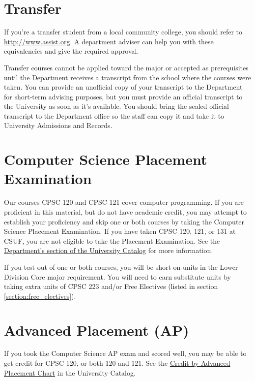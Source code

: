 \documentclass{book}
\newcommand{\campusname}{CSUF}
\begin{document}
\section{Transfer}

If you're a transfer student from a local community college, you should refer to \url{http://www.assist.org}. A department adviser can help you with these equivalencies and give the required approval.

Transfer courses cannot be applied toward the major or accepted as prerequisites until the Department receives a transcript from the school where the courses were taken. You can provide an unofficial copy of your transcript to the Department for short-term advising purposes, but you must provide an official transcript to the University as soon as it’s available. You should bring the sealed official transcript to the Department office so the staff can copy it and take it to University Admissions and Records.

\section{Computer Science Placement Examination}
\label{section:placement}
Our courses CPSC 120 and CPSC 121 cover computer programming. If you are proficient in this material, but do not have academic credit, you may attempt to establish your proficiency and skip one or both courses by taking the Computer Science Placement Examination. If you have taken CPSC 120, 121, or 131 at \campusname, you are not eligible to take the Placement Examination. See the \href{http://catalog.fullerton.edu/preview_program.php?catoid=2&poid=537&returnto=137}{Department's section of the University Catalog} for more information.

If you test out of one or both courses, you will be short on units in the Lower Division Core major requirement. You will need to earn substitute units by taking extra units of CPSC 223 and/or Free Electives (listed in section \ref{section:free_electives}).

\section{Advanced Placement (AP)}
\label{section:ap}
If you took the Computer Science AP exam and scored well, you may be able to get credit for CPSC 120, or both 120 and 121. See the \href{http://catalog.fullerton.edu/content.php?catoid=2&navoid=153#Credit%20by%20Advanced%20Placement%20Chart}{Credit by Advanced Placement Chart} in the University Catalog.
\end{document}
